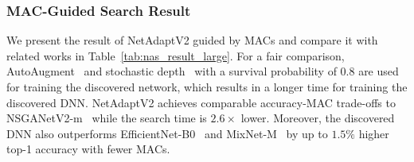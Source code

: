 \subsubsection{MAC-Guided Search Result}
\label{subsec:mac_guided_search_result}

We present the result of NetAdaptV2 guided by MACs and compare it with related works in Table~\ref{tab:nas_result_large}. For a fair comparison, AutoAugment~\cite{autoaugment} and stochastic depth~\cite{stochastic_depth} with a survival probability of 0.8 are used for training the discovered network, which results in a longer time for training the discovered DNN. NetAdaptV2 achieves comparable accuracy-MAC trade-offs to NSGANetV2-m~\cite{lu2020nsganetv2} while the search time is $2.6 \times$ lower. Moreover, the discovered DNN also outperforms EfficientNet-B0~\cite{Tan2019EfficientNet} and MixNet-M~\cite{Tan2019MixConvMD} by up to $1.5\%$ higher top-1 accuracy with fewer MACs.

